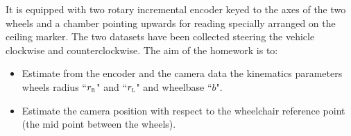 It is equipped with two rotary incremental encoder keyed to the axes of the two wheels and a chamber pointing upwards for reading specially arranged on the ceiling marker.
The two datasets have been collected steering the vehicle clockwise and counterclockwise.
The aim of the homework is to:
\begin{itemize}
\item Estimate from the encoder and the camera data the kinematics parameters wheels radius ``\emph{$r_\textsc{r}$}" and ``\emph{$r_\textsc{l}$}" and wheelbase ``\emph{$b$}".
\item Estimate the camera position with respect to the wheelchair reference point (the mid point between the wheels).
\end{itemize}